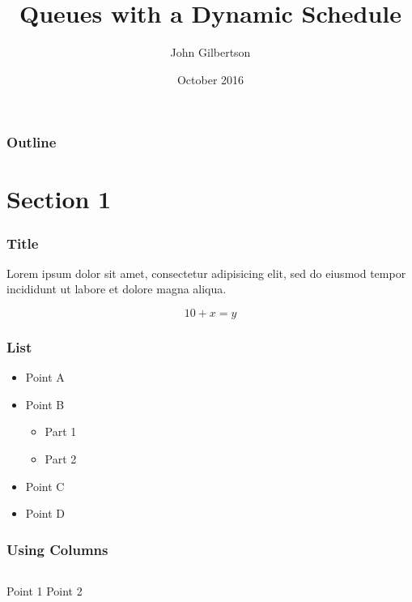 \documentclass{beamer}
\title{Queues with a Dynamic Schedule}
\author{John Gilbertson}
\date{October 2016}
\begin{document}
\begin{frame}
	\titlepage
\end{frame}

\begin{frame}
	\frametitle{Outline}
	\tableofcontents
\end{frame}

\section{Section 1}

\begin{frame}
	\frametitle{Title}
	Lorem ipsum dolor sit amet, consectetur adipisicing elit, sed do eiusmod tempor incididunt ut labore et dolore magna aliqua.

	\begin{equation}
		10 + x = y
	\end{equation}
\end{frame}

\begin{frame}
	\frametitle{List}
	\begin{itemize}
		\item Point A
		\item Point B
		\begin{itemize}
			\item Part 1
			\item Part 2
		\end{itemize}
		\item Point C
		\item Point D
	\end{itemize}
\end{frame}

\begin{frame}
	\frametitle{Using Columns}
	\begin{columns}
		Point 1
		Point 2
	\end{columns}
\end{frame}
\end{document}
